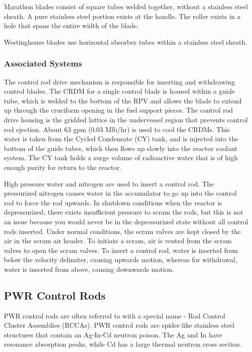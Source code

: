 \documentclass[10pt]{article}
\newcounter{subsubsubsection}[subsubsection]
\begin{document}
Marathon blades consist of square tubes welded together, without a stainless steel sheath. A pure stainless steel portion exists at the handle. The roller exists in a hole that spans the entire width of the blade. 

Westinghouse blades use horizontal absorber tubes within a stainless steel sheath. 


\subsubsection{Associated Systems}

The control rod drive mechanism is responsible for inserting and withdrawing control blades. The CRDM for a single control blade is housed within a guide tube, which is welded to the bottom of the RPV and allows the blade to extend up through the cruciform opening in the fuel support pieces. The control rod drive housing is the gridded lattice in the undervessel region that prevents control rod ejection. About 63 gpm (0.03 Mlb/hr) is used to cool the CRDMs. This water is taken from the Cycled Condensate (CY) tank, and is injected into the bottom of the guide tubes, which then flows up slowly into the reactor coolant system. The CY tank holds a surge volume of radioactive water that is of high enough purity for return to the reactor.

High pressure water and nitrogen are used to insert a control rod. The pressurized nitrogen causes water in the accumulator to go up into the control rod to force the rod upwards. In shutdown conditions when the reactor is depressurized, there exists insufficient pressure to scram the rods, but this is not an issue because you would never be in the depressurized state without all control rods inserted. Under normal conditions, the scram valves are kept closed by the air in the scram air header. To initiate a scram, air is vented from the scram valves to open the scram valves. To insert a control rod, water is inserted from below the velocity delimiter, causing upwards motion, whereas for withdrawal, water is inserted from above, causing downwards motion. 

\subsection{PWR Control Rods}
PWR control rods are often referred to with a special name - Rod Control Cluster Assemblies (RCCAs). PWR control rods are spider-like stainless steel structures that contain an Ag-In-Cd neutron poison. The Ag and In have resonance absorption peaks, while Cd has a large thermal neutron cross section. 
\end{document}
